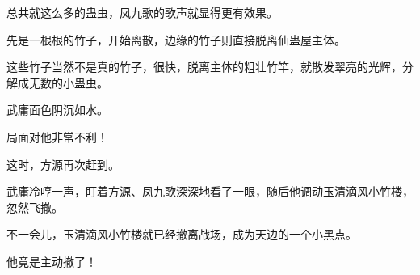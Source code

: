 \begin{this_body}
总共就这么多的蛊虫，凤九歌的歌声就显得更有效果。

先是一根根的竹子，开始离散，边缘的竹子则直接脱离仙蛊屋主体。

这些竹子当然不是真的竹子，很快，脱离主体的粗壮竹竿，就散发翠亮的光辉，分解成无数的小蛊虫。

武庸面色阴沉如水。

局面对他非常不利！

这时，方源再次赶到。

武庸冷哼一声，盯着方源、凤九歌深深地看了一眼，随后他调动玉清滴风小竹楼，忽然飞撤。

不一会儿，玉清滴风小竹楼就已经撤离战场，成为天边的一个小黑点。

他竟是主动撤了！

\end{this_body}

